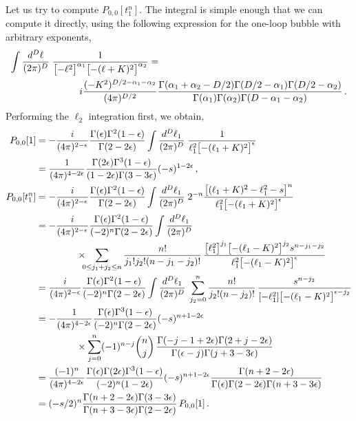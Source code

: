 \documentclass[aps,prd,preprint,groupedaddress,nofootinbib,showpacs,eqsecnum]{revtex4}
\def\Pn#1#2{P_{#1,#2}}
\begin{document}
Let us try to compute $\Pn00[t_1^n]$.  The integral is simple enough that
we can compute it directly, using the following expression for the one-loop
bubble with arbitrary exponents,
\begin{equation}
\begin{aligned} 
\int \frac{d^D\ell}{(2\pi)^D}\;&
   \frac{1}{\bigl[-\ell^2\bigr]^{\alpha_1} \bigl[-(\ell+K)^2\bigr]^{\alpha_2}} =
\\&\hspace*{10mm}
i\frac{(-K^2)^{D/2-\alpha_1-\alpha_2}}{(4\pi)^{D/2}} 
	\frac{\Gamma(\alpha_1+\alpha_2-D/2)
	      \Gamma(D/2-\alpha_1)\Gamma(D/2-\alpha_2)} 
	{\Gamma(\alpha_1)\Gamma(\alpha_2)\Gamma(D-\alpha_1-\alpha_2)}\,.
\end{aligned}
\end{equation}
Performing the $\ell_2$ integration first, we obtain,
\begin{equation}
\begin{aligned}
\Pn00[1] &= -\frac{i}{(4\pi)^{2-\e}}
\frac{\Gamma(\e) \Gamma^2(1-\e)}{\Gamma(2-2\e)}
\int \frac{d^D\ell_1}{(2\pi)^D}\;\frac1{\ell_1^2 \bigl[-(\ell_1+K)^2\bigr]^{\e}}
\\ &= \frac{1}{(4\pi)^{4-2\e}}
 \frac{\Gamma(2\e)\Gamma^3(1-\e)}{(1-2\e)\Gamma(3-3\e)} (-s)^{1-2\e}\,,\\
%
\Pn00[t_1^n] &= -\frac{i}{(4\pi)^{2-\e}}
\frac{\Gamma(\e) \Gamma^2(1-\e)}{\Gamma(2-2\e)}
\int \frac{d^D\ell_1}{(2\pi)^D}\;2^{-n}\frac{\bigl[(\ell_1+K)^2-\ell_1^2-s\bigr]^n}
                              {\ell_1^2 \bigl[-(\ell_1+K)^2\bigr]^{\e}}
\\ &= -\frac{i}{(4\pi)^{2-\e}}
      \frac{\Gamma(\e) \Gamma^2(1-\e)}{(-2)^n\Gamma(2-2\e)}
      \int \frac{d^D\ell_1}{(2\pi)^D}\;
\\&\hspace*{15mm}\times\hspace*{-2mm}\sum_{0\leq j_1+j_2\leq n} 
\frac{n!}{j_1! j_2! (n-j_1-j_2)!} \, 
\frac{\bigl[\ell_1^2\bigr]^{j_1} \bigl[-(\ell_1-K)^2\bigr]^{j_2} s^{n-j_1-j_2}}
     {\ell_1^2 \bigl[-(\ell_1-K)^2\bigr]^{\e}}
\\ &= \frac{i}{(4\pi)^{2-\e}}
      \frac{\Gamma(\e) \Gamma^2(1-\e)}{(-2)^n\Gamma(2-2\e)}
\int \frac{d^D\ell_1}{(2\pi)^D}\;
\sum_{j_2=0}^n 
\frac{n!}{j_2! (n-j_2)!} \, 
\frac{s^{n-j_2}}
{[-\ell_1^2] \bigl[-(\ell_1-K)^2\bigr]^{\e-j_2}}
\\ &= -\frac{1}{(4\pi)^{4-2\e}}
      \frac{\Gamma(\e) \Gamma^3(1-\e)}{(-2)^n\Gamma(2-2\e)} (-s)^{n+1-2\e}
\\&\hspace*{15mm}\times\sum_{j=0}^n (-1)^{n-j}\binom{n}{j}\, 
\frac{\Gamma(-j-1+2\e) \Gamma(2+j-2\e)}{\Gamma(\e-j)\Gamma(j+3-3\e)}
\\ &= \frac{(-1)^n}{(4\pi)^{4-2\e}}
      \frac{\Gamma(\e)\Gamma(2\e) \Gamma^3(1-\e)}
           {(-2)^n (1-2\e)} (-s)^{n+1-2\e}
\frac{\Gamma(n+2-2\e)}{\Gamma(\e)\Gamma(2-2\e)\Gamma(n+3-3\e)}
\\ &=  (-s/2)^{n} \frac{\Gamma(n+2-2\e)\Gamma(3-3\e)}
                      {\Gamma(n+3-3\e)\Gamma(2-2\e)}\,\Pn00[1]\,.
%
\end{aligned}
\label{ExplicitGeneralSunrise}
\end{equation}
\end{document}

